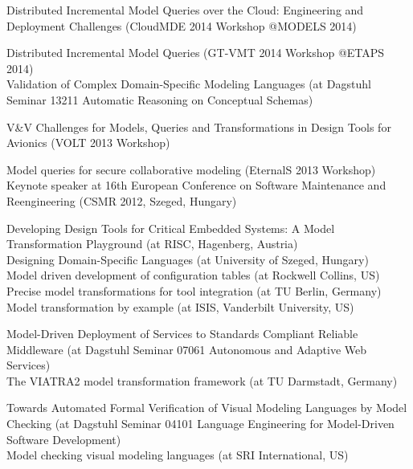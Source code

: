 \documentclass{xetexCV}
\begin{document}
Distributed Incremental  Model Queries over the Cloud: Engineering and Deployment Challenges 
(CloudMDE 2014 Workshop @MODELS 2014)


Distributed Incremental Model Queries (GT-VMT 2014 Workshop @ETAPS 2014) \\


Validation of Complex Domain-Specific Modeling Languages  (at Dagstuhl Seminar 13211 
Automatic Reasoning on Conceptual Schemas)


V\&V Challenges for Models, Queries and Transformations in Design Tools for Avionics (VOLT 2013 Workshop)


Model queries for secure collaborative modeling (EternalS 2013 Workshop)
\\

Keynote speaker  at 16th European Conference on Software Maintenance
and Reengineering (CSMR 2012, Szeged, Hungary) 

Developing Design Tools for Critical Embedded Systems: A Model Transformation Playground
(at RISC, Hagenberg, Austria) \\

Designing Domain-Specific Languages (at University of Szeged, Hungary)
 \\

Model driven development of configuration tables (at Rockwell Collins, US)
 \\

Precise model transformations for tool integration (at TU Berlin, Germany)
 \\

Model transformation by example (at ISIS, Vanderbilt University, US)

Model-Driven Deployment of Services to Standards Compliant Reliable
Middleware (at Dagstuhl Seminar 07061 Autonomous and Adaptive Web Services)
\\

The VIATRA2 model transformation framework (at TU Darmstadt, Germany)

Towards Automated Formal Verification of Visual Modeling Languages
by Model Checking (at Dagstuhl Seminar 04101 Language Engineering for Model-Driven
Software Development) \\

Model checking visual modeling languages (at SRI International, US) 


\end{document}
